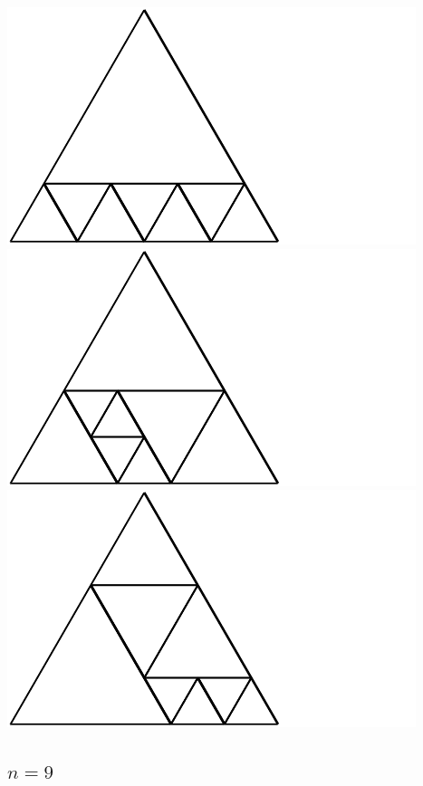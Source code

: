 \documentclass[12pt,amstags,fleqn]{article}
\theoremstyle{plain}
\theoremstyle{definition}
\begin{document}
\includegraphics{output-dissections-dissection8_i31_r2_c4.pdf}
\includegraphics{output-dissections-dissection8_i37_r2_c2.pdf}
\includegraphics{output-dissections-dissection8_i37_r2_c4.pdf}

\subsection*{$n = 9$}
\end{document}
